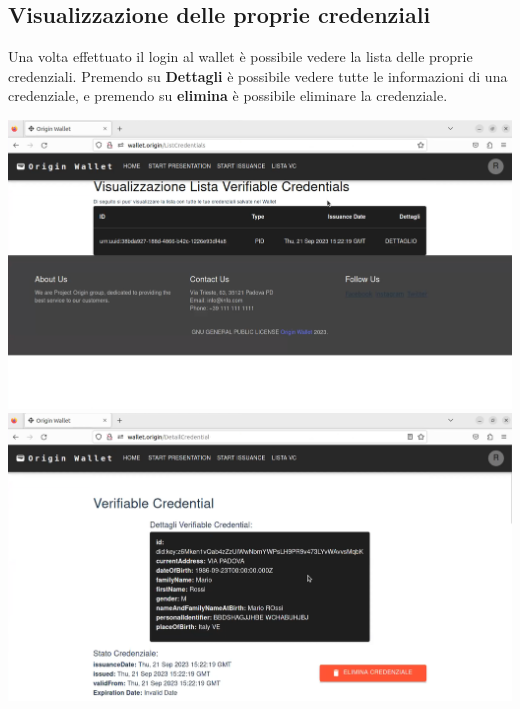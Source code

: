 \subsection{Visualizzazione delle proprie credenziali}
Una volta effettuato il login al wallet è possibile vedere la lista delle proprie credenziali. Premendo su \textbf{Dettagli} è possibile vedere tutte le informazioni di una credenziale, e premendo su \textbf{elimina} è possibile eliminare la credenziale.
\begin{center}
    \includegraphics[scale = 0.2]{./res/img/wallet/new/wallet_credential_list.png}
    \includegraphics[scale = 0.2]{./res/img/wallet/new/wallet_credential_detail.png}
\end{center}

